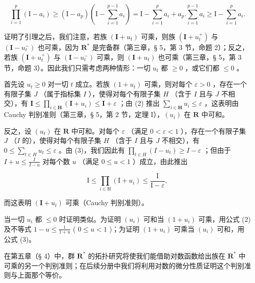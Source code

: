 \[
\prod_ {i = 1} ^ {p} \left(\mathrm{I} - a _ {i}\right) \geqslant \left(\mathrm{I} - a _ {p}\right) \left(\mathrm{I} - \sum_ {i = 1} ^ {p - 1} a _ {i}\right) = \mathrm{I} - \sum_ {i = 1} ^ {p} a _ {i} + a _ {p}. \sum_ {i = 1} ^ {p - 1} a _ {i} \geqslant \mathrm{I} - \sum_ {i = 1} ^ {p} a _ {i}.
\]

证明了引理之后，我们注意，若族 \((\mathbf{I} + u_{t})\) 可乘，则族 \((\mathbf{I} + u_{t}^{+})\) 与 \((\mathbf{I} - u_{t}^{-})\) 也可乘，因为 \(\mathbf{R}^*\) 是完备群（第三章，§ 5，第 3 节，命题 2）；反之，若族 \((\mathbf{I} + u_{t}^{+})\) 与 \((\mathbf{I} - u_{t}^{-})\) 可乘，则 \((\mathbf{I} + u_{t})\) 也可乘（第三章，§ 5，第 3 节，命题 3）。因此我们只需考虑两种情形：一切 \(u_{t}\) 都 \(\geqslant 0\) ，或它们都 \(\leqslant 0\) 。

首先设 \(u_{t} \geqslant 0\) 对一切 \(t\) 成立。若族 \((1 + u_{t})\) 可乘，则对每个 \(\varepsilon > 0\) ，存在一个有限子集 \(J\) （属于指标集 \(I\) ），使得对每个有限子集 \(H\) （含于 \(I\) 且与 \(J\) 不相交），有 \(\mathbf{I} \leqslant \prod_{i \in \mathbf{H}} (\mathbf{I} + u_i) \leqslant \mathbf{I} + \varepsilon\) ；由 (2) 推出 \(\sum_{i \in \mathbf{H}} u_i \leqslant \varepsilon\) ，这表明由 Cauchy 判别准则（第三章，§ 5，第 2 节，定理 I），\((u_i)\) 在 \(\mathbf{R}\) 中可和。

反之，设 \((u_{t})\) 在 \(\mathbf{R}\) 中可和。对每个 \(\varepsilon\) （满足 \(0 < \varepsilon < 1\) ），存在一个有限子集 \(J\) （\(I\) 的），使得对每个有限子集 \(H\) （含于 \(I\) 且与 \(J\) 不相交），有 \(0 \leqslant \sum_{t \in H} u_{t} \leqslant \varepsilon\) 。由 (3)，我们因此有 \(\prod_{t \in H} (I - u_{t}) \geqslant I - \varepsilon\) ；但由于 \(I + u \leqslant \frac{I}{I - u}\) 对每个数 \(u\) （满足 \(0 \leqslant u < 1\) ）成立，由此推出

\[
\mathrm{I} \leqslant \prod_ {i \in \mathrm{H}} (\mathrm{I} + u _ {i}) \leqslant \frac {\mathrm{I}}{\mathrm{I} - \varepsilon},
\]

而这表明 \((\mathbf{I} + u_{t})\) 可乘（Cauchy 判别准则）。

当一切 \(u_{i}\) 都 \(\leqslant 0\) 时证明类似。为证明 \((u_{i})\) 可和当 \((1 + u_{i})\) 可乘，用公式 (2) 及不等式 \(1 - u \leqslant \frac{1}{1 + u}\) ( \(0 \leqslant u < 1\) )；为证明 \((1 + u_{i})\) 可乘当 \((u_{i})\) 可和，用公式 (3)。

在第五章（§ 4）中，群 \(\mathbf{R}^*\) 的拓扑研究将使我们能借助对数函数给出族在 \(\mathbf{R}^*\) 中可乘的另一个判别准则；在后续分册中我们将利用对数的微分性质证明这个判别准则与上面那个等价。

